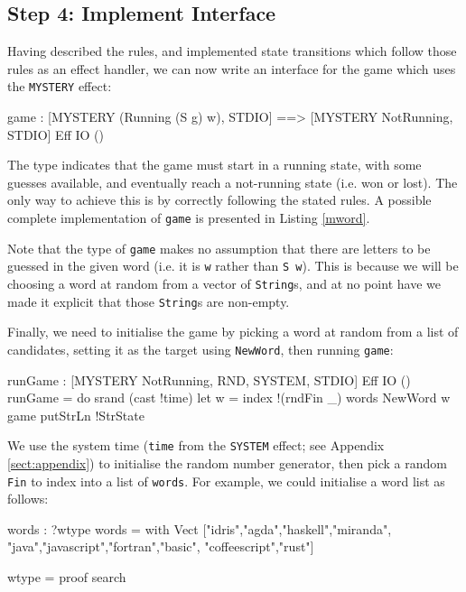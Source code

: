 \subsection{Step 4: Implement Interface}

Having described the rules, and implemented state transitions which follow
those rules as an effect handler, we can now write an interface for the
game which uses the \texttt{MYSTERY} effect:

\begin{code}
game : { [MYSTERY (Running (S g) w), STDIO] ==>
         [MYSTERY NotRunning, STDIO] } Eff IO ()
\end{code}

\noindent
The type indicates that the game must start in a running state, with some
guesses available, and eventually reach a not-running state (i.e. won or lost). 
The only way to achieve this is by correctly following the stated rules.
A possible complete implementation of \texttt{game} is presented in Listing
\ref{mword}. 

Note that the type of \texttt{game} makes no assumption that there
are letters to be guessed in the given word (i.e. it is \texttt{w} rather than
\texttt{S w}). This is because we will be choosing a word at random from a
vector of \texttt{String}s, and at no point have we made it explicit that
those \texttt{String}s are non-empty.

Finally, we need to initialise the game by picking a word at random from a
list of candidates, setting it as the target using \texttt{NewWord}, then
running \texttt{game}:

\begin{code}
runGame : { [MYSTERY NotRunning, RND, SYSTEM, STDIO] } Eff IO ()
runGame = do srand (cast !time)
             let w = index !(rndFin _) words
             NewWord w
             game
             putStrLn !StrState
\end{code}

\noindent
We use the system time (\texttt{time} from the \texttt{SYSTEM} effect; see
Appendix \ref{sect:appendix}) to initialise the random number generator,
then pick a random \texttt{Fin} to index into a list of \texttt{words}.
For example, we could initialise a word list as follows:

\begin{code}
words : ?wtype
words = with Vect ["idris","agda","haskell","miranda",
         "java","javascript","fortran","basic",
         "coffeescript","rust"]
  
wtype = proof search
\end{code}

